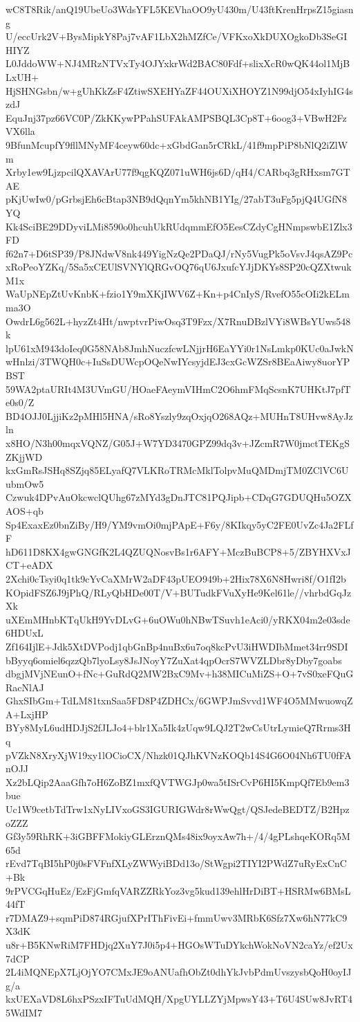 wC8T8Rik/anQ19UbeUo3WdsYFL5KEVhaOO9yU430m/U43ftKrenHrpsZ15giasng
U/eccUrk2V+BysMipkY8Paj7vAF1LbX2hMZfCe/VFKxoXkDUXOgkoDb3SeGIHIYZ
L0JddoWW+NJ4MRzNTVxTy4OJYxkrWd2BAC80Fdf+slixXcR0wQK44ol1MjBLxUH+
HjSHNGsbn/w+gUhKkZsF4ZtiwSXEHYaZF44OUXiXHOYZ1N99djO54xIyhIG4szdJ
EquJnj37pz66VC0P/ZkKKywPPahSUFAkAMPSBQL3Cp8T+6oog3+VBwH2FzVX6lla
9BfunMcupfY9fllMNyMF4ceyw60dc+xGbdGan5rCRkL/41f9mpPiP8bNlQ2iZlWm
Xrby1ew9LjzpcilQXAVArU77f9qgKQZ071uWH6js6D/qH4/CARbq3gRHxsm7GTAE
pKjUwIw0/pGrbsjEh6cBtap3NB9dQqnYm5khNB1YIg/27abT3uFg5pjQ4UGfN8YQ
Kk4SciBE29DDyviLMi8590o0hcuhUkRUdqmmEfO5EesCZdyCgHNmpswbE1Zlx3FD
f62n7+D6tSP39/P8JNdwV8nk449YigNzQe2PDaQJ/rNy5VugPk5oVsvJ4qsAZ9Pc
xRoPeoYZKq/5Sa5xCEUlSVNYlQRGvOQ76qU6JxufcYJjDKYs8SP20cQZXtwukM1x
WaUpNEpZtUvKnbK+fzio1Y9mXKjIWV6Z+Kn+p4CnIyS/RvefO55cOIi2kELmma3O
OwdrL6g562L+hyzZt4Ht/nwptvrPiwOsq3T9Fzx/X7RnuDBzlVYi8WBsYUws548k
lpU61xM943doIeq0G58NAb8JmhNuczfcwLNjjrH6EaYYi0r1NsLmkp0KUc0aJwkN
wHnlzi/3TWQH0c+IuSsDUWcpOQeNwIYcsyjdEJ3cxGcWZSr8BEaAiwy8uorYPBST
59WA2ptaURIt4M3UVmGU/HOaeFAeymVIHmC2O6hmFMqScsnK7UHKtJ7pfTe0s0/Z
BD4OJJ0LjjiKz2pMHl5HNA/sRo8Yszly9zqOxjqO268AQz+MUHnT8UHvw8AyJzln
x8HO/N3h00mqxVQNZ/G05J+W7YD3470GPZ99dq3v+JZcmR7W0jmctTEKgSZKjjWD
kxGmRsJSHq8SZjq85ELyafQ7VLKRoTRMcMklTolpvMuQMDmjTM0ZClVC6UubmOw5
Czwuk4DPvAuOkcwclQUhg67zMYd3gDnJTC81PQJipb+CDqG7GDUQHu5OZXAOS+qb
Sp4ExaxEz0bnZiBy/H9/YM9vmOi0mjPApE+F6y/8KIkqy5yC2FE0UvZc4Ja2FLfF
hD611D8KX4gwGNGfK2L4QZUQNosvBs1r6AFY+MczBuBCP8+5/ZBYHXVxJCT+eADX
2Xchi0cTsyi0q1tk9cYvCaXMrW2aDF43pUEO949b+2Hix78X6N8Hwri8f/O1fI2b
KOpidFSZ6J9jPhQ/RLyQbHDe00T/V+BUTudkFVuXyHe9Kel61le//vhrbdGqJzXk
uXEmMHnbKTqUkH9YvDLvG+6uOWu0hNBwTSuvh1eAci0/yRKX04m2e03sde6HDUxL
Zf164IjlE+Jdk5XtDVPodj1qbGnBp4nuBx6u7oq8kcPvU3iHWDIbMmet34rr9SDI
bByyq6omiel6qzzQb7lyoLsy8JsJNoyY7ZuXat4qpOcrS7WVZLDbr8yDby7goabs
dbgjMVjNEunO+fNc+GuRdQ2MW2BxC9Mv+h38MICuMiZS+O+7vS0xeFQuGRacNlAJ
GhxSIbGm+TdLM81txnSaa5FD8P4ZDHCx/6GWPJmSvvd1WF4O5MMwuowqZA+LxjHP
BYy8MyL6udHDJjS2fJLJo4+blr1Xa5Ik4zUqw9LQJ2T2wCsUtrLymieQ7Rrms3Hq
pVZkN8XryXjW19xy1lOCioCX/Nhzk01QJhKVNzKOQb14S4G6O04Nh6TU0fFAnOJJ
Xz2bLQip2AaaGfh7oH6ZoBZ1mxfQVTWGJp0wa5tISrCvP6HI5KmpQf7Eb9em3bue
Uc1W9cetbTdTrw1xNyLIVxoGS3IGURIGWdr8rWwQgt/QSJedeBEDTZ/B2HpzoZZZ
Gf3y59RhRK+3iGBFFMokiyGLErznQMs48ix9oyxAw7h+/4/4gPLshqeKORq5M65d
rEvd7TqBI5hP0j0sFVFnfXLyZWWyiBDd13o/StWgpi2TIYI2PWdZ7uRyExCnC+Bk
9rPVCGqHuEz/EzFjGmfqVARZZRkYoz3vg5kud139ehlHrDiBT+HSRMw6BMsL44fT
r7DMAZ9+sqmPiD874RGjufXPrIThFivEi+fmmUwv3MRbK6Sfz7Xw6hN77kC9X3dK
u8r+B5KNwRiM7FHDjq2XuY7J0i5p4+HGOsWTuDYkchWokNoVN2caYz/ef2Ux7dCP
2L4iMQNEpX7LjOjYO7CMxJE9oANUafhObZt0dhYkJvbPdmUvszysbQoH0oyIJg/a
kxUEXaVD8L6hxPSzxIFTuUdMQH/XpgUYLLZYjMpwsY43+T6U4SUw8JvRT45WdIM7
